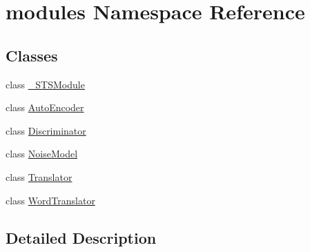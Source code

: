 \hypertarget{namespacemodules}{}\section{modules Namespace Reference}
\label{namespacemodules}
\subsection*{Classes}
\begin{DoxyCompactItemize}
\item 
class \hyperlink{classmodules_1_1__STSModule}{\+\_\+\+S\+T\+S\+Module}
\item 
class \hyperlink{classmodules_1_1AutoEncoder}{Auto\+Encoder}
\item 
class \hyperlink{classmodules_1_1Discriminator}{Discriminator}
\item 
class \hyperlink{classmodules_1_1NoiseModel}{Noise\+Model}
\item 
class \hyperlink{classmodules_1_1Translator}{Translator}
\item 
class \hyperlink{classmodules_1_1WordTranslator}{Word\+Translator}
\end{DoxyCompactItemize}


\subsection{Detailed Description}
\begin{DoxyVerb}\end{DoxyVerb}
 